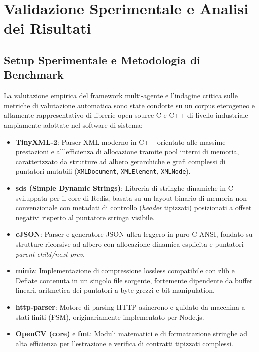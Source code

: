 \chapter{Validazione Sperimentale e Analisi dei Risultati}
\label{chap:validazione_sperimentale}

\section{Setup Sperimentale e Metodologia di Benchmark}
\label{sec:setup_sperimentale}

La valutazione empirica del framework multi-agente e l'indagine critica sulle metriche di valutazione automatica sono state condotte su un corpus eterogeneo e altamente rappresentativo di librerie open-source C e C++ di livello industriale ampiamente adottate nel software di sistema:
\begin{itemize}
    \item \textbf{TinyXML-2}: Parser XML moderno in C++ orientato alle massime prestazioni e all'efficienza di allocazione tramite pool interni di memoria, caratterizzato da strutture ad albero gerarchiche e grafi complessi di puntatori mutabili (\texttt{XMLDocument}, \texttt{XMLElement}, \texttt{XMLNode}).
    \item \textbf{sds (Simple Dynamic Strings)}: Libreria di stringhe dinamiche in C sviluppata per il core di Redis, basata su un layout binario di memoria non convenzionale con metadati di controllo (\emph{header} tipizzati) posizionati a offset negativi rispetto al puntatore stringa visibile.
    \item \textbf{cJSON}: Parser e generatore JSON ultra-leggero in puro C ANSI, fondato su strutture ricorsive ad albero con allocazione dinamica esplicita e puntatori \emph{parent-child/next-prev}.
    \item \textbf{miniz}: Implementazione di compressione lossless compatibile con zlib e Deflate contenuta in un singolo file sorgente, fortemente dipendente da buffer lineari, aritmetica dei puntatori a byte grezzi e bit-manipulation.
    \item \textbf{http-parser}: Motore di parsing HTTP asincrono e guidato da macchina a stati finiti (FSM), originariamente implementato per Node.js.
    \item \textbf{OpenCV (core)} e \textbf{fmt}: Moduli matematici e di formattazione stringhe ad alta efficienza per l'estrazione e verifica di contratti tipizzati complessi.
\end{itemize}

